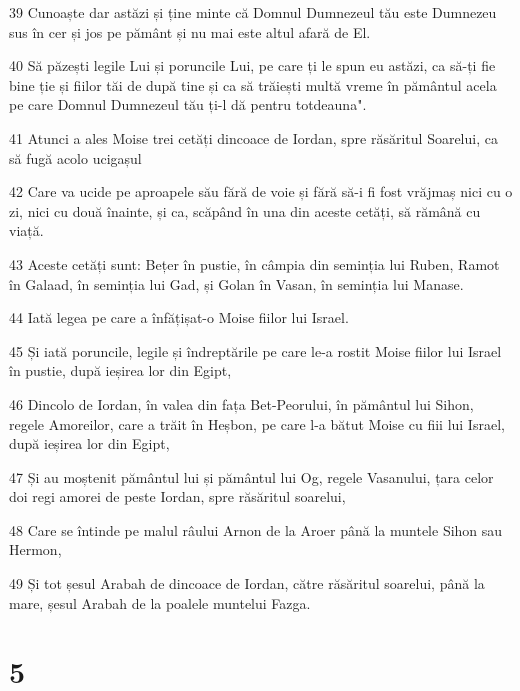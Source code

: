 \par 39 Cunoaște dar astăzi și ține minte că Domnul Dumnezeul tău este Dumnezeu sus în cer și jos pe pământ și nu mai este altul afară de El.
\par 40 Să păzești legile Lui și poruncile Lui, pe care ți le spun eu astăzi, ca să-ți fie bine ție și fiilor tăi de după tine și ca să trăiești multă vreme în pământul acela pe care Domnul Dumnezeul tău ți-l dă pentru totdeauna".
\par 41 Atunci a ales Moise trei cetăți dincoace de Iordan, spre răsăritul Soarelui, ca să fugă acolo ucigașul
\par 42 Care va ucide pe aproapele său fără de voie și fără să-i fi fost vrăjmaș nici cu o zi, nici cu două înainte, și ca, scăpând în una din aceste cetăți, să rămână cu viață.
\par 43 Aceste cetăți sunt: Bețer în pustie, în câmpia din seminția lui Ruben, Ramot în Galaad, în seminția lui Gad, și Golan în Vasan, în seminția lui Manase.
\par 44 Iată legea pe care a înfățișat-o Moise fiilor lui Israel.
\par 45 Și iată poruncile, legile și îndreptările pe care le-a rostit Moise fiilor lui Israel în pustie, după ieșirea lor din Egipt,
\par 46 Dincolo de Iordan, în valea din fața Bet-Peorului, în pământul lui Sihon, regele Amoreilor, care a trăit în Heșbon, pe care l-a bătut Moise cu fiii lui Israel, după ieșirea lor din Egipt,
\par 47 Și au moștenit pământul lui și pământul lui Og, regele Vasanului, țara celor doi regi amorei de peste Iordan, spre răsăritul soarelui,
\par 48 Care se întinde pe malul râului Arnon de la Aroer până la muntele Sihon sau Hermon,
\par 49 Și tot șesul Arabah de dincoace de Iordan, către răsăritul soarelui, până la mare, șesul Arabah de la poalele muntelui Fazga.

\chapter{5}


